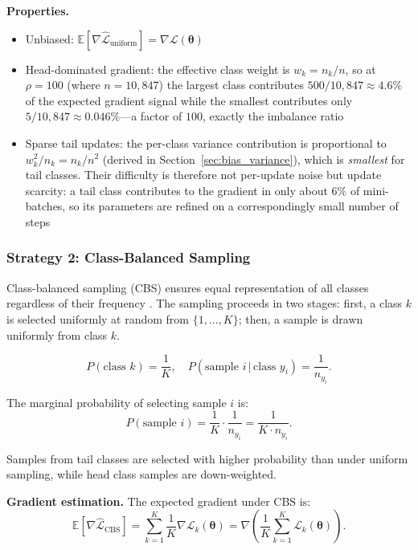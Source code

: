 \documentclass[12pt,a4paper]{article}
\newcommand{\E}{\mathbb{E}}
\newcommand{\btheta}{\boldsymbol{\theta}}
\begin{document}
\textbf{Properties.}
\begin{itemize}[leftmargin=*]

    \item Unbiased: $\E[\nabla\hat{\mathcal{L}}_{\text{uniform}}] = \nabla\mathcal{L}(\btheta)$
    \item Head-dominated gradient: the effective class weight is $w_k = n_k/n$, so at $\rho = 100$ (where $n = 10{,}847$) the largest class contributes $500/10{,}847 \approx 4.6\%$ of the expected gradient signal while the smallest contributes only $5/10{,}847 \approx 0.046\%$---a factor of $100$, exactly the imbalance ratio
    \item Sparse tail updates: the per-class variance contribution is proportional to $w_k^2/n_k = n_k/n^2$ (derived in Section~\ref{sec:bias_variance}), which is \emph{smallest} for tail classes. Their difficulty is therefore not per-update noise but update scarcity: a tail class contributes to the gradient in only about $6\%$ of mini-batches, so its parameters are refined on a correspondingly small number of steps
\end{itemize}

\subsubsection{Strategy 2: Class-Balanced Sampling}
\label{subsec:balanced_sampling}
Class-balanced sampling (CBS) ensures equal representation of all classes regardless of their frequency \citep{shen2016relay, kang2020decoupling}. The sampling proceeds in two stages: first, a class $k$ is selected uniformly at random from $\{1, \ldots, K\}$; then, a sample is drawn uniformly from class $k$.

\begin{equation}
    P(\text{class } k) = \frac{1}{K}, \quad P(\text{sample } i \,|\, \text{class } y_i) = \frac{1}{n_{y_i}}.
    \label{eq:cbs_probs}
\end{equation}

The marginal probability of selecting sample $i$ is:
\begin{equation}
    P(\text{sample } i) = \frac{1}{K} \cdot \frac{1}{n_{y_i}} = \frac{1}{K \cdot n_{y_i}}.
    \label{eq:cbs_marginal}
\end{equation}

Samples from tail classes are selected with higher probability than under uniform sampling, while head class samples are down-weighted.

\textbf{Gradient estimation.} The expected gradient under CBS is:
\begin{equation}
    \E[\nabla \hat{\mathcal{L}}_{\text{CBS}}] = \sum_{k=1}^{K} \frac{1}{K} \nabla \mathcal{L}_k(\btheta) = \nabla \left( \frac{1}{K} \sum_{k=1}^{K} \mathcal{L}_k(\btheta) \right).
    \label{eq:cbs_gradient}
\end{equation}
\end{document}
